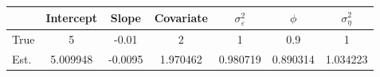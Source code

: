 \begin{tabular}{lcccccc}
\toprule
& Intercept & Slope & Covariate & $\sigma_\varepsilon^2$ & $\phi$ & $\sigma_\eta^2$ \\
\midrule
True & 5 & -0.01 & 2 & 1 & 0.9 & 1 \\
\midrule
Est. & 5.009948 & -0.0095 & 1.970462 & 0.980719 & 0.890314 & 1.034223 \\
\bottomrule
\end{tabular}
